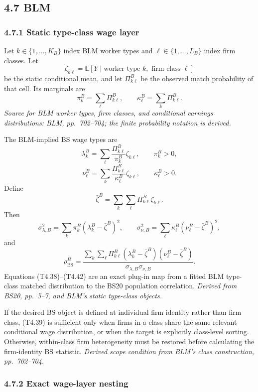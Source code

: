 \documentclass[11pt]{article}
\begin{document}
\subsection{4.7 BLM}

\subsubsection{4.7.1 Static type-class wage layer}

Let \(k\in\{1,\ldots,K_B\}\) index BLM worker types and
\(\ell\in\{1,\ldots,L_B\}\) index firm classes.  Let
\[
\zeta_{k\ell}
=
\mathbb E[
Y\mid\text{worker type }k,\text{ firm class }\ell
]
\tag{T4.36}
\]
be the static conditional mean, and let
\(\Pi^B_{k\ell}\) be the observed match probability of that cell.  Its
marginals are
\[
\pi_k^B=\sum_\ell\Pi^B_{k\ell},
\qquad
\kappa_\ell^B=\sum_k\Pi^B_{k\ell}.
\tag{T4.37}
\]
\textit{Source for BLM worker types, firm classes, and conditional earnings
distributions: BLM, pp.\ 702--704; the finite probability notation is
derived.}

The BLM-implied BS wage types are
\[
\lambda_k^B
=
\sum_\ell
\frac{\Pi^B_{k\ell}}{\pi_k^B}
\zeta_{k\ell},
\qquad
\pi_k^B>0,
\tag{T4.38}
\]
\[
\nu_\ell^B
=
\sum_k
\frac{\Pi^B_{k\ell}}{\kappa_\ell^B}
\zeta_{k\ell},
\qquad
\kappa_\ell^B>0.
\tag{T4.39}
\]
Define
\[
\bar\zeta^B
=
\sum_k\sum_\ell\Pi^B_{k\ell}\zeta_{k\ell}.
\tag{T4.40}
\]
Then
\[
\sigma_{\lambda,B}^2
=
\sum_k\pi_k^B(\lambda_k^B-\bar\zeta^B)^2,
\qquad
\sigma_{\nu,B}^2
=
\sum_\ell\kappa_\ell^B(\nu_\ell^B-\bar\zeta^B)^2,
\tag{T4.41}
\]
and
\[
\rho_{\mathrm{BS}}^B
=
\frac{
\displaystyle
\sum_k\sum_\ell
\Pi^B_{k\ell}
(\lambda_k^B-\bar\zeta^B)
(\nu_\ell^B-\bar\zeta^B)
}{
\sigma_{\lambda,B}\sigma_{\nu,B}
}.
\tag{T4.42}
\]
Equations (T4.38)--(T4.42) are an exact plug-in map from a fitted BLM
type-class matched distribution to the BS20 population correlation.
\textit{Derived from BS20, pp.\ 5--7, and BLM's static type-class objects.}

If the desired BS object is defined at individual firm identity rather than
firm class, (T4.39) is sufficient only when firms in a class share the same
relevant conditional wage distribution, or when the target is explicitly
class-level sorting.  Otherwise, within-class firm heterogeneity must be
restored before calculating the firm-identity BS statistic.
\textit{Derived scope condition from BLM's class construction,
pp.\ 702--704.}

\subsubsection{4.7.2 Exact wage-layer nesting}
\end{document}
